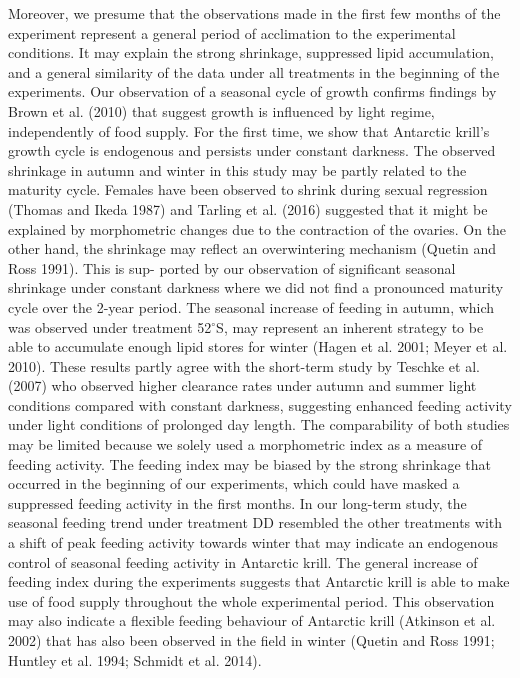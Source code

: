 Moreover, we presume that the observations made in the first few months of the experiment represent a general period of acclimation to the experimental conditions. It may explain the strong shrinkage, suppressed lipid accumulation, and a general similarity of the data under all treatments in the beginning of the experiments. 
Our observation of a seasonal cycle of growth confirms findings by Brown et al. (2010) that suggest growth is influenced by light regime, independently of food supply. For the first time, we show that Antarctic krill’s growth cycle is endogenous and persists under constant darkness. The observed shrinkage in autumn and winter in this study may be partly related to the maturity cycle. Females have been observed to shrink during sexual regression (Thomas and Ikeda 1987) and Tarling et al. (2016) suggested that it might be explained by morphometric changes due to the contraction of the ovaries. On the other hand, the shrinkage may reflect an overwintering mechanism (Quetin and Ross 1991). This is sup- ported by our observation of significant seasonal shrinkage under constant darkness where we did not find a pronounced maturity cycle over the 2-year period. 
The seasonal increase of feeding in autumn, which was observed under treatment 52$^{\circ}$S, may represent an inherent strategy to be able to accumulate enough lipid stores for winter (Hagen et al. 2001; Meyer et al. 2010). These results partly agree with the short-term study by Teschke et al. (2007) who observed higher clearance rates under autumn and summer light conditions compared with constant darkness, suggesting enhanced feeding activity under light conditions of prolonged day length. The comparability of both studies may be limited because we solely used a morphometric index as a measure of feeding activity. The feeding index may be biased by the strong shrinkage that occurred in the beginning of our experiments, which could have masked a suppressed feeding activity in the first months. In our long-term study, the seasonal feeding trend under treatment DD resembled the other treatments with a shift of peak feeding activity towards winter that may indicate an endogenous control of seasonal feeding activity in Antarctic krill. The general increase of feeding index during the experiments suggests that Antarctic krill is able to make use of food supply throughout the whole experimental period. This observation may also indicate a flexible feeding behaviour of Antarctic krill (Atkinson et al. 2002) that has also been observed in the field in winter (Quetin and Ross 1991; Huntley et al. 1994; Schmidt et al. 2014). 
